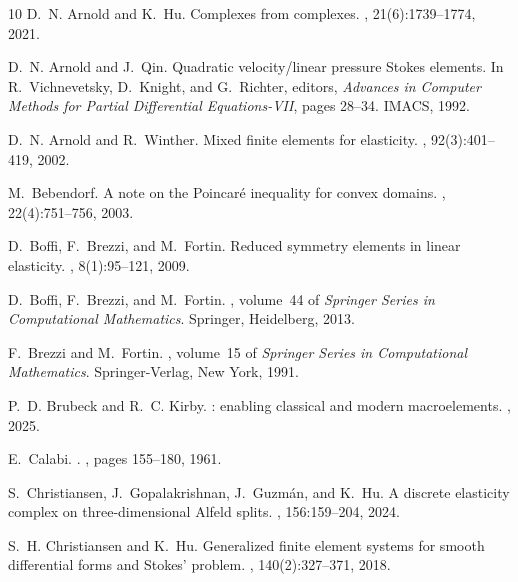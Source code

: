 \documentclass[12pt]{amsart}
\numberwithin{equation}{section}
\theoremstyle{definition}
\theoremstyle{remark}
\renewcommand{\(}{\bigl(}
\renewcommand{\)}{\bigr)}
\begin{document}
\begin{thebibliography}{10}
D.~N. Arnold and K.~Hu.
\newblock Complexes from complexes.
, 21(6):1739--1774, 2021.

D.~N. Arnold and J.~Qin.
\newblock Quadratic velocity/linear pressure {S}tokes elements.
\newblock In R.~Vichnevetsky, D.~Knight, and G.~Richter, editors, {\em
  {Advances in Computer Methods for Partial Differential Equations-VII}}, pages
  28--34. IMACS, 1992.

D.~N. Arnold and R.~Winther.
\newblock Mixed finite elements for elasticity.
, 92(3):401--419, 2002.

M.~Bebendorf.
\newblock A note on the {P}oincar\'{e} inequality for convex domains.
, 22(4):751--756, 2003.

D.~Boffi, F.~Brezzi, and M.~Fortin.
\newblock Reduced symmetry elements in linear elasticity.
, 8(1):95--121, 2009.

D.~Boffi, F.~Brezzi, and M.~Fortin.
, volume~44 of
  {\em Springer Series in Computational Mathematics}.
\newblock Springer, Heidelberg, 2013.

F.~Brezzi and M.~Fortin.
, volume~15 of {\em
  Springer Series in Computational Mathematics}.
\newblock Springer-Verlag, New York, 1991.

P.~D. Brubeck and R.~C. Kirby.
: enabling classical and modern macroelements.
, 2025.

E.~Calabi.
.
, pages 155--180, 1961.

S.~Christiansen, J.~Gopalakrishnan, J.~Guzm{\'{a}}n, and K.~Hu.
\newblock A discrete elasticity complex on three-dimensional {Alfeld} splits.
, 156:159--204, 2024.

S.~H. Christiansen and K.~Hu.
\newblock Generalized finite element systems for smooth differential forms and
  {S}tokes' problem.
, 140(2):327--371, 2018.


\end{thebibliography}
\end{document}
